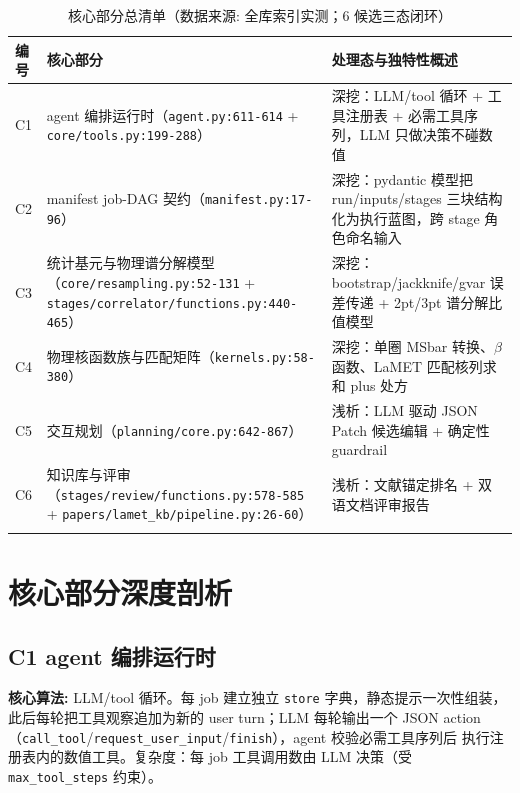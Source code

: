 \documentclass[UTF8]{ctexart}
\begin{document}
\begin{xltabular}{\textwidth}{lXX}
\toprule
\textcolor{algo}{编号} & 核心部分 & 处理态与独特性概述 \\
\midrule
\endhead
C1 & agent 编排运行时（\texttt{\nolinkurl{agent.py:611-614}} + \texttt{\nolinkurl{core/tools.py:199-288}}） & 深挖：LLM/tool 循环 + 工具注册表 + 必需工具序列，LLM 只做决策不碰数值 \\
C2 & manifest job-DAG 契约（\texttt{\nolinkurl{manifest.py:17-96}}） & 深挖：pydantic 模型把 run/inputs/stages 三块结构化为执行蓝图，跨 stage 角色命名输入 \\
C3 & 统计基元与物理谱分解模型（\texttt{\nolinkurl{core/resampling.py:52-131}} + \texttt{\nolinkurl{stages/correlator/functions.py:440-465}}） & 深挖：bootstrap/jackknife/gvar 误差传递 + 2pt/3pt 谱分解比值模型 \\
C4 & 物理核函数族与匹配矩阵（\texttt{\nolinkurl{kernels.py:58-380}}） & 深挖：单圈 MSbar 转换、$\beta$ 函数、LaMET 匹配核列求和 plus 处方 \\
C5 & 交互规划（\texttt{\nolinkurl{planning/core.py:642-867}}） & 浅析：LLM 驱动 JSON Patch 候选编辑 + 确定性 guardrail \\
C6 & 知识库与评审（\texttt{\nolinkurl{stages/review/functions.py:578-585}} + \texttt{\nolinkurl{papers/lamet_kb/pipeline.py:26-60}}） & 浅析：文献锚定排名 + 双语文档评审报告 \\
\bottomrule
\caption{核心部分总清单（数据来源: 全库索引实测；6 候选三态闭环）}
\end{xltabular}

\section{核心部分深度剖析}

\subsection{C1 agent 编排运行时}

\begin{algobox}
\textbf{核心算法:} LLM/tool 循环。每 job 建立独立 \texttt{store} 字典，静态提示一次性组装，
此后每轮把工具观察追加为新的 user turn；LLM 每轮输出一个 JSON action
（\texttt{call\_tool}/\texttt{request\_user\_input}/\texttt{finish}），agent 校验必需工具序列后
执行注册表内的数值工具。复杂度：每 job 工具调用数由 LLM 决策（受 \texttt{max\_tool\_steps} 约束）。
\end{algobox}
\end{document}

